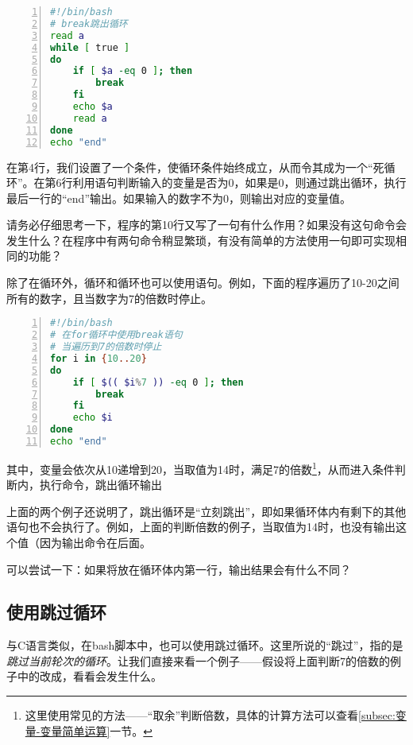 \begin{lstlisting}[language=bash,numbers=left,caption={break\_example}]
#!/bin/bash
# break跳出循环
read a
while [ true ]
do
    if [ $a -eq 0 ]; then
        break
    fi
    echo $a
    read a
done
echo "end"
\end{lstlisting}

在第4行，我们设置了一个条件，使循环条件始终成立，从而令其成为一个“死循环”。在第6行利用语句判断输入的变量是否为0，如果是0，则通过跳出循环，执行最后一行的“end”输出。如果输入的数字不为0，则输出对应的变量值。

\begin{attention}
    请务必仔细思考一下，程序的第10行又写了一句有什么作用？如果没有这句命令会发生什么？在程序中有两句命令稍显繁琐，有没有简单的方法使用一句即可实现相同的功能？
\end{attention}

除了在循环外，循环和循环也可以使用语句。例如，下面的程序遍历了10-20之间所有的数字，且当数字为7的倍数时停止。

\begin{lstlisting}[language=bash,numbers=left,caption={break\_example2}]
#!/bin/bash
# 在for循环中使用break语句
# 当遍历到7的倍数时停止
for i in {10..20}
do
    if [ $(( $i%7 )) -eq 0 ]; then
        break
    fi
    echo $i
done
echo "end" 
\end{lstlisting}

其中，变量会依次从10递增到20，当取值为14时，满足7的倍数\footnote{这里使用常见的方法——“取余”判断倍数，具体的计算方法可以查看\ref{subsec:变量-变量简单运算}一节。}，从而进入条件判断内，执行命令，跳出循环输出

\begin{attention}
    上面的两个例子还说明了，跳出循环是“立刻跳出”，即如果循环体内有剩下的其他语句也不会执行了。例如，上面的判断倍数的例子，当取值为14时，也没有输出这个值（因为输出命令在后面。

    可以尝试一下：如果将放在循环体内第一行，输出结果会有什么不同？
\end{attention}

\subsection{使用跳过循环}\label{subsec:循环控制-使用continue跳过循环}

与C语言类似，在bash脚本中，也可以使用跳过循环。这里所说的“跳过”，指的是\emph{跳过当前轮次的循环}。让我们直接来看一个例子——假设将上面判断7的倍数的例子中的改成，看看会发生什么。

